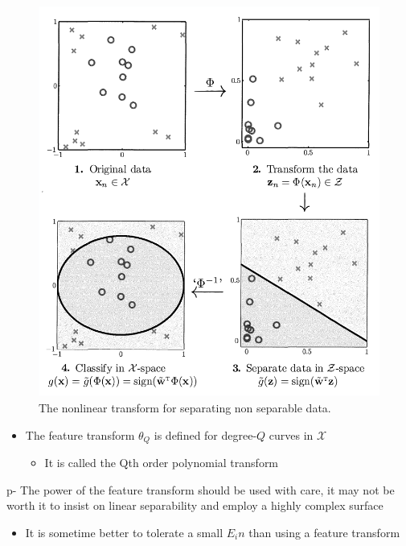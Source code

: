 \documentclass[11pt]{article}
\begin{document}
\begin{figure}[htbp]
\centering
\includegraphics[width=.9\linewidth]{The Linear Model/screenshot_2018-09-03_18-28-08.png}
\caption{\label{fig:orgfd63357}
The nonlinear transform for separating non separable data.}
\end{figure}

\begin{itemize}
\item The feature transform \(\theta_Q\) is defined for degree-\(Q\) curves in \(\mathcal X\)
\begin{itemize}
\item It is called the Qth order polynomial transform
\end{itemize}
\end{itemize}
p- The power of the feature transform should be used with care, it may not be worth it to insist on linear separability and employ a highly complex surface
\begin{itemize}
\item It is sometime better to tolerate a small \(E_in\) than using a feature transform
\end{itemize}
\end{document}
